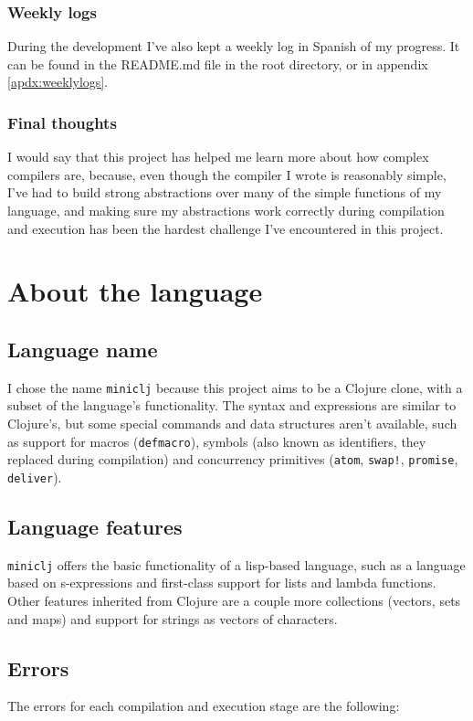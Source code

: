 \documentclass[11pt]{scrreprt}
\begin{document}
\subsection{Weekly logs}
During the development I've also kept a weekly log in Spanish of my progress. It can be found in the README.md file in the root directory, or in appendix \ref{apdx:weeklylogs}.

\subsection{Final thoughts}
I would say that this project has helped me learn more about how complex compilers are, because, even though the compiler I wrote is reasonably simple, I've had to build strong abstractions over many of the simple functions of my language, and making sure my abstractions work correctly during compilation and execution has been the hardest challenge I've encountered in this project.


\chapter{About the language}
\section{Language name}
I chose the name \texttt{miniclj} because this project aims to be a Clojure clone, with a subset of the language's functionality. The syntax and expressions are similar to Clojure's, but some special commands and data structures aren't available, such as support for macros (\texttt{defmacro}), symbols (also known as identifiers, they replaced during compilation) and concurrency primitives (\texttt{atom}, \texttt{swap!}, \texttt{promise}, \texttt{deliver}).

\section{Language features}
\texttt{miniclj} offers the basic functionality of a lisp-based language, such as a language based on s-expressions and first-class support for lists and lambda functions. Other features inherited from Clojure are a couple more collections (vectors, sets and maps) and support for strings as vectors of characters.

\section{Errors}
The errors for each compilation and execution stage are the following:
\end{document}
